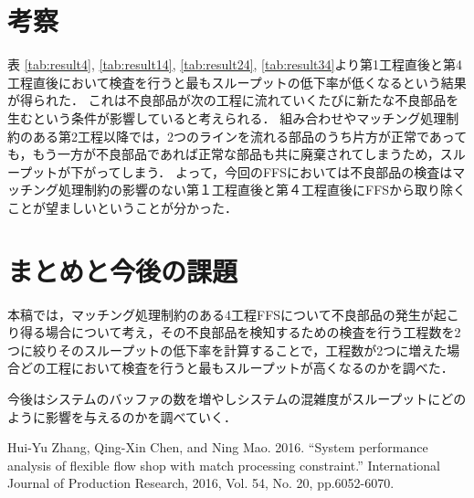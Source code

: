 \documentclass{iseman}
\begin{document}
\section{考察}
表 \ref{tab:result4}, \ref{tab:result14}, \ref{tab:result24}, \ref{tab:result34}より第1工程直後と第4工程直後において検査を行うと最もスループットの低下率が低くなるという結果が得られた．
これは不良部品が次の工程に流れていくたびに新たな不良部品を生むという条件が影響していると考えられる．
組み合わせやマッチング処理制約のある第2工程以降では，2つのラインを流れる部品のうち片方が正常であっても，もう一方が不良部品であれば正常な部品も共に廃棄されてしまうため，スループットが下がってしまう．
よって，今回のFFSにおいては不良部品の検査はマッチング処理制約の影響のない第１工程直後と第４工程直後にFFSから取り除くことが望ましいということが分かった．


\section{まとめと今後の課題}
本稿では，マッチング処理制約のある4工程FFSについて不良部品の発生が起こり得る場合について考え，その不良部品を検知するための検査を行う工程数を2つに絞りそのスループットの低下率を計算することで，工程数が2つに増えた場合どの工程において検査を行うと最もスループットが高くなるのかを調べた．

今後はシステムのバッファの数を増やしシステムの混雑度がスループットにどのように影響を与えるのかを調べていく．


\begin{thebibliography}{9}
	Hui-Yu Zhang, Qing-Xin Chen, and Ning Mao. 2016. ``System performance analysis of flexible flow shop with match processing constraint.'' International Journal of Production Research, 2016, Vol. 54, No. 20, pp.6052-6070.
\end{thebibliography}
\end{document}
